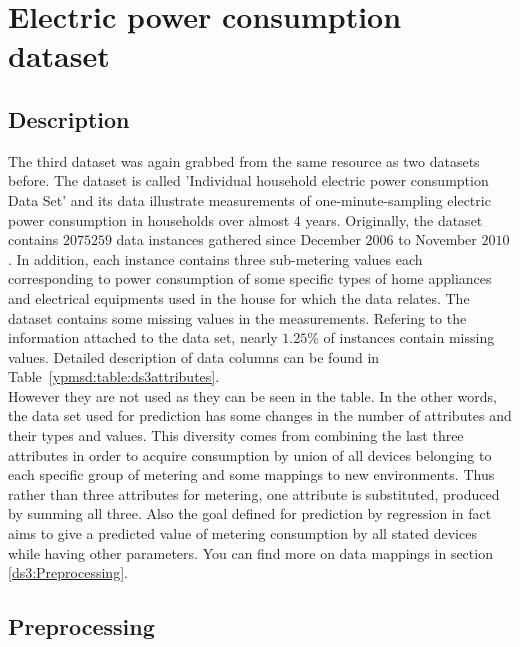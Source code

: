 \section{Electric power consumption dataset\label{db:ds3}}
\subsection{Description}
The third dataset was again grabbed from the same resource as two datasets before.
The dataset is called 'Individual household electric power consumption Data
Set\cite{ds:household}' and its data illustrate measurements of
one-minute-sampling electric power consumption in households over almost $4$
years. Originally, the dataset contains $2075259$ data instances gathered since
December $2006$ to November $2010$. In addition, each instance contains three
sub-metering values each corresponding to power consumption of some specific types
of home appliances and electrical equipments used in the house for which the
data relates. The dataset contains some missing values in the measurements.
Refering to the information attached to the data set, nearly $1.25\%$ of
instances contain missing values. Detailed description of data columns can be
found in Table~\ref{ypmsd:table:ds3attributes}.\\
However they are not used as they can be seen in the table. In the other words,
the data set used for prediction has some changes in the number of attributes
and their types and values.
This diversity comes from combining the last three attributes in order to acquire consumption by union of all devices
belonging to each specific group of metering and some mappings to new
environments.
Thus rather than three attributes for metering, one attribute is substituted, produced by summing all three. Also the
goal defined for prediction by regression in fact aims to give a predicted value
of metering consumption by all stated devices while having other parameters.
You can find more on data mappings in section \ref{ds3:Preprocessing}.








\subsection{Preprocessing\label{ds3:Preprocessing}}

